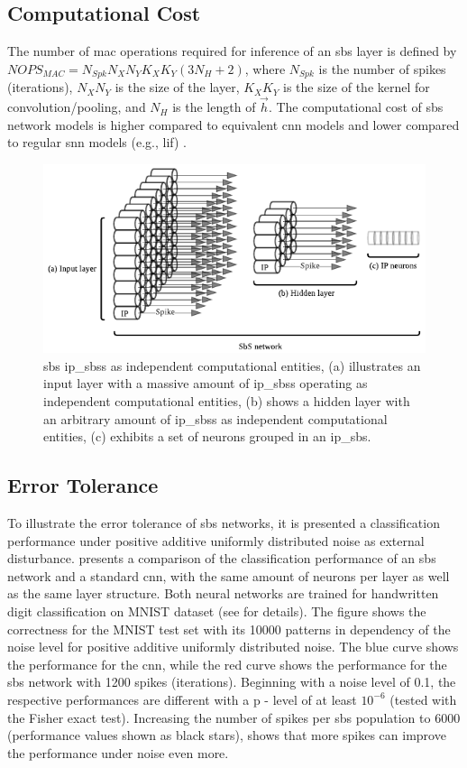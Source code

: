 \subsection{Computational Cost}

The number of \gls{mac} operations required for inference of an \gls{sbs} layer is defined by $NOPS_{MAC}=N_{Spk} N_X N_Y K_X K_Y (3 N_H + 2)$, where $N_{Spk}$ is the number of spikes (iterations), $N_X N_Y$ is the size of the layer, $K_X K_Y$ is the size of the kernel for convolution/pooling, and $N_H$ is the length of $\vec{h}$. The computational cost of \gls{sbs} network models is higher compared to equivalent \gls{cnn} models and lower compared to regular \gls{snn} models (e.g., \gls{lif}) \mbox{\cite{izhikevich2004model}}.


\begin{figure}[b!]
	\centering
	\includegraphics[width=0.5\columnwidth]{./chapters/sbs_accelerator/figures/SbS_layer.pdf}
	\caption{\gls{sbs} \glspl{ip_sbs} as independent computational entities, (a) illustrates an input layer with a massive amount of \glspl{ip_sbs} operating as independent computational entities, (b) shows a hidden layer with an arbitrary amount of \glspl{ip_sbs} as independent computational entities, (c) exhibits a set of neurons grouped in an \gls{ip_sbs}.}
	\label{fig:SbS_layer}
\end{figure}


\subsection{Error Tolerance}

To illustrate the error tolerance of \gls{sbs} networks, it is presented a classification performance under positive additive uniformly distributed noise as external disturbance.  presents a comparison of the classification performance of an \gls{sbs} network and a standard \gls{cnn}, with the same amount of
neurons per layer as well as the same layer structure. Both neural networks are trained for handwritten digit classification on MNIST dataset \cite{lecun1998mnist} (see \cite{rotermund2019Backpropagation} for details). The figure shows the correctness for the MNIST test set with its \num[group-separator={,}]{10000} patterns in dependency of the noise level for positive additive
uniformly distributed noise. The blue curve shows the performance for
the \gls{cnn}, while the red curve shows the performance for
the \gls{sbs} network with \num[group-separator={,}]{1200} spikes (iterations). Beginning
with a noise level of 0.1, the respective performances are different
with a p - level of at least $10^{-6}$ (tested with the Fisher exact
test). Increasing the number of spikes per \gls{sbs} population to \num[group-separator={,}]{6000}
(performance values shown as black stars), shows that more spikes can
improve the performance under noise even more.

